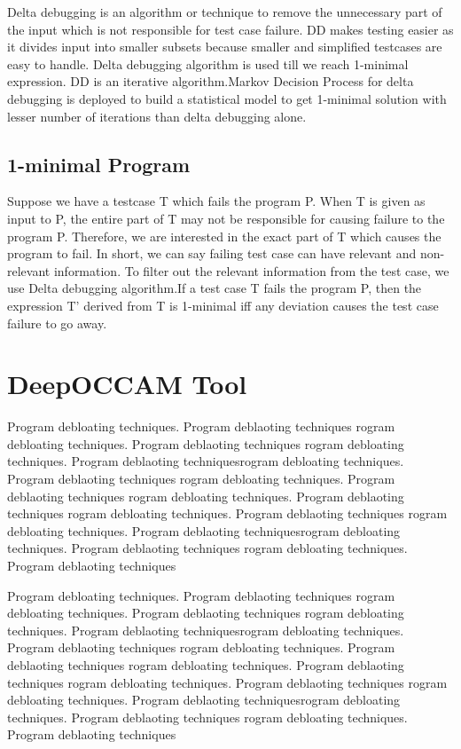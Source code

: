 \documentclass{relatorio}
\begin{document}
Delta debugging is an algorithm or technique to remove the unnecessary part of the input which is not responsible for test case failure. DD makes testing easier as it divides input into smaller subsets because smaller  and simplified testcases are easy to handle. Delta debugging algorithm is used till we reach 1-minimal expression. DD is an iterative algorithm.Markov Decision Process for delta debugging is deployed to build a statistical model to get 1-minimal solution with lesser number of iterations than delta debugging alone.


\subsection{1-minimal Program}%
\label{Tools}

Suppose we have a testcase T which fails the program P. When T is given as input to P, the entire part of T may not be responsible for causing failure to the program P. Therefore, we are interested in the exact part of T which causes the program to fail. In short, we can say failing test case can have relevant and non-relevant information. To filter out the relevant information from the test case, we use Delta debugging algorithm.If a test case T fails the program P, then the expression T’ derived from T is 1-minimal iff any deviation causes the test case failure to go away.

\section{DeepOCCAM Tool}%
\label{Tools}

Program debloating techniques. Program deblaoting techniques rogram debloating techniques. Program deblaoting techniques
rogram debloating techniques. Program deblaoting techniquesrogram debloating techniques. Program deblaoting techniques
rogram debloating techniques. Program deblaoting techniques rogram debloating techniques. Program deblaoting techniques
rogram debloating techniques. Program deblaoting techniques 
rogram debloating techniques. Program deblaoting techniquesrogram debloating techniques. Program deblaoting techniques
rogram debloating techniques. Program deblaoting techniques

Program debloating techniques. Program deblaoting techniques rogram debloating techniques. Program deblaoting techniques
rogram debloating techniques. Program deblaoting techniquesrogram debloating techniques. Program deblaoting techniques
rogram debloating techniques. Program deblaoting techniques rogram debloating techniques. Program deblaoting techniques
rogram debloating techniques. Program deblaoting techniques 
rogram debloating techniques. Program deblaoting techniquesrogram debloating techniques. Program deblaoting techniques
rogram debloating techniques. Program deblaoting techniques	
\end{document}
